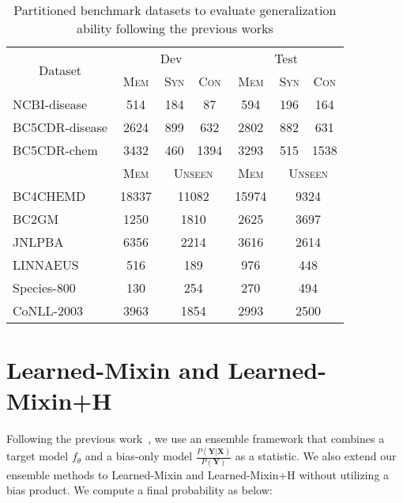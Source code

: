 \documentclass[11pt]{article}
\begin{document}
\begin{table}[h]
\centering
\begin{adjustbox}{width=0.48\textwidth}
\begin{tabular}{l c c c c c c }
\toprule
\multicolumn{1}{c}{\multirow{2}{*}{Dataset}} & \multicolumn{3}{c}{Dev}              & \multicolumn{3}{c}{Test}              \\ \cmidrule{2-7} 
\multicolumn{1}{c}{} & \textsc{Mem}     & \textsc{Syn}          & \textsc{Con}          & \textsc{Mem}      & \textsc{Syn}          & \textsc{Con}          \\ \midrule
NCBI-disease             & 514     & 184          & 87           & 594      & 196          & 164          \\ 
BC5CDR-disease           & 2624    & 899          & 632          & 2802     & 882          & 631          \\ 
BC5CDR-chem              & 3432    & 460          & 1394         & 3293     & 515          & 1538         \\ \midrule
 & \textsc{Mem}     & \multicolumn{2}{c}{\textsc{Unseen}} & \textsc{Mem}      & \multicolumn{2}{c}{\textsc{Unseen}} \\ \midrule
BC4CHEMD                 & 18337   & \multicolumn{2}{c}{11082}  & 15974    & \multicolumn{2}{c}{9324}   \\ 
BC2GM                    & 1250    & \multicolumn{2}{c}{1810}   & 2625     & \multicolumn{2}{c}{3697}   \\ 
JNLPBA                   & 6356    & \multicolumn{2}{c}{2214}   & 3616     & \multicolumn{2}{c}{2614}   \\ 
LINNAEUS                 & 516     & \multicolumn{2}{c}{189}    & 976      & \multicolumn{2}{c}{448}    \\ 
Species-800              & 130     & \multicolumn{2}{c}{254}    & 270      & \multicolumn{2}{c}{494}    \\ 
CoNLL-2003               & 3963    & \multicolumn{2}{c}{1854}   & 2993     & \multicolumn{2}{c}{2500}   \\ \bottomrule
\end{tabular}
\end{adjustbox}
\caption{Partitioned benchmark datasets to evaluate generalization ability following the previous works \protect\cite{lin2020rigourous,kim2021your}}
\label{tab:partition dataset}
\end{table}

\section{Learned-Mixin and Learned-Mixin+H}
\label{app:learned-mixin}
Following the previous work~\cite{clark2019don}, we use an ensemble framework that combines a target model $f_\theta$ and a bias-only model $\frac{P(\textbf{Y}|\textbf{X})}{P(\textbf{Y})}$ as a statistic.
We also extend our ensemble methods to Learned-Mixin and Learned-Mixin+H without utilizing a bias product.
We compute a final probability as below:
\end{document}
